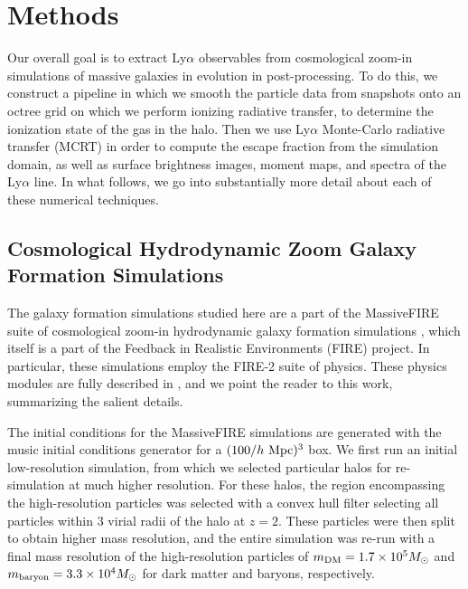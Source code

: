 \chapter{Methods}
\label{sec:methods}

Our overall goal is to extract Ly$\alpha$ observables from cosmological zoom-in simulations of massive galaxies in evolution in post-processing.
To do this, we construct a pipeline in which we smooth the particle data from snapshots onto an octree grid on which we perform ionizing radiative transfer, to determine the ionization state of the gas in the halo.
Then we use Ly$\alpha$ Monte-Carlo radiative transfer (MCRT) in order to compute the escape fraction from the simulation domain, as well as surface brightness images, moment maps, and spectra of the Ly$\alpha$ line.
In what follows, we go into substantially more detail about each of these numerical techniques.

\section{Cosmological Hydrodynamic Zoom Galaxy Formation Simulations}

The galaxy formation simulations studied here are a part of the MassiveFIRE suite of cosmological zoom-in hydrodynamic galaxy formation simulations \citep{Feldmann2016, Feldmann2017}, which itself is a part of the Feedback in Realistic Environments (FIRE) project.
In particular, these simulations employ the FIRE-2 suite of physics.
These physics modules are fully described in \citet{Hopkins2018}, and we point the reader to this work, summarizing the salient details.

The initial conditions for the MassiveFIRE simulations are generated with the {\sc music} initial conditions generator for a $(100/h \ {\rm Mpc})^3$ box.
We first run an initial low-resolution simulation, from which we selected particular halos for re-simulation at much higher resolution.
For these halos, the region encompassing the high-resolution particles was selected with a convex hull filter selecting all particles within $3$ virial radii of the halo at $z=2.$
These particles were then split to obtain higher mass resolution, and the entire simulation was re-run with a final mass resolution of the high-resolution particles of $m_{\rm DM} = 1.7 \times 10^5 M_\odot$ and $m_{\rm baryon} = 3.3 \times 10^4 M_\odot$ for dark matter and baryons, respectively.

